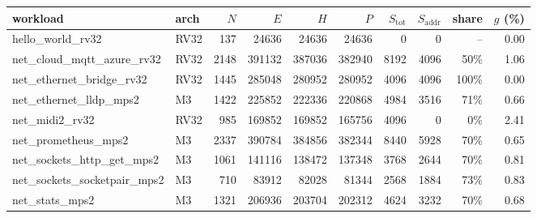 \begin{tabular}{llrrrrrrrr}
\toprule
workload & arch & $N$ & $E$ & $H$ & $P$ & $S_\mathrm{tot}$ & $S_\mathrm{addr}$ & share & $g$ (\%) \\
\midrule
hello\_world\_rv32 & RV32 & 137 & 24636 & 24636 & 24636 & 0 & 0 & -- & 0.00 \\
net\_cloud\_mqtt\_azure\_rv32 & RV32 & 2148 & 391132 & 387036 & 382940 & 8192 & 4096 & 50\% & 1.06 \\
net\_ethernet\_bridge\_rv32 & RV32 & 1445 & 285048 & 280952 & 280952 & 4096 & 4096 & 100\% & 0.00 \\
net\_ethernet\_lldp\_mps2 & M3 & 1422 & 225852 & 222336 & 220868 & 4984 & 3516 & 71\% & 0.66 \\
net\_midi2\_rv32 & RV32 & 985 & 169852 & 169852 & 165756 & 4096 & 0 & 0\% & 2.41 \\
net\_prometheus\_mps2 & M3 & 2337 & 390784 & 384856 & 382344 & 8440 & 5928 & 70\% & 0.65 \\
net\_sockets\_http\_get\_mps2 & M3 & 1061 & 141116 & 138472 & 137348 & 3768 & 2644 & 70\% & 0.81 \\
net\_sockets\_socketpair\_mps2 & M3 & 710 & 83912 & 82028 & 81344 & 2568 & 1884 & 73\% & 0.83 \\
net\_stats\_mps2 & M3 & 1321 & 206936 & 203704 & 202312 & 4624 & 3232 & 70\% & 0.68 \\
\bottomrule
\end{tabular}
